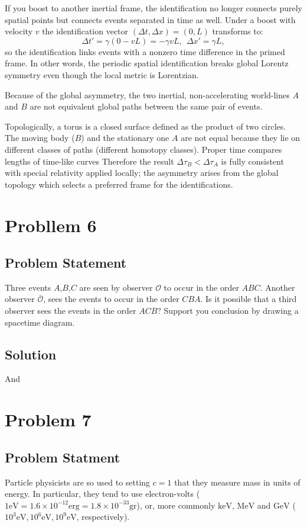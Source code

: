 \documentclass[10pt,twocoloumn]{article}
\newcommand{\addsvg}[4][1.0]{
    \begin{figure}[H]
        \centering
        
        \caption{#4}
        \label{fig:#3}
    \end{figure}
}
\begin{document}
If you boost to another inertial frame, the identification no longer connects purely spatial points but connects events separated in time as well. Under a boost with velocity $v$ the identification vector $(\Delta t, \Delta x) = (0,L)$ transforms to:
\begin{equation}
\Delta t' = \gamma(0-vL) = -\gamma vL , \ \ \Delta x' = \gamma L,
\end{equation}
so the identification links events with a nonzero time difference in the primed frame. In other words, the periodic spatial identification breaks global Lorentz symmetry even though the local metric is Lorentzian.

Because of the global asymmetry, the two inertial, non-accelerating world-lines $A$ and $B$ are not equivalent global paths between the same pair of events.
\addsvg[0.5]{./different-homotopy-classes-on-the-torus.svg}{homtop}{}
Topologically, a torus is a closed surface defined as the product of two circles. The moving body ($B$) and the stationary one $A$ are not equal because they lie on different classes of paths (different homotopy classes). Proper time compares lengths of time-like curves
Therefore the result $\Delta\tau_B < \Delta\tau_A$ is fully consistent with special relativity applied locally; the asymmetry arises from the global topology which selects a preferred frame for the identifications.

\section*{Probllem 6}
\subsection*{Problem Statement}
Three events $A$,$B$,$C$ are seen by observer $\mathcal{O}$ to occur in the order $ABC$. Another observer $\bar{\mathcal{O}}$, sees the events to occur in the order $CBA$. Is it possible that a third observer sees the events in the order $ACB$? Support you conclusion by drawing a spacetime diagram.
\subsection*{Solution}
And
\section*{Problem 7}
\subsection*{Problem Statment}
Particle physicists are so used to setting $c=1$ that they measure mass in units of energy. In particular, they tend to use electron-volts ($1\text{eV} = 1.6 \times10^{-12}\text{erg} = 1.8\times10^{-33}\text{gr}$), or, more commonly $\text{keV}$, $\text{MeV}$ and $\text{GeV}$ ($10^3 \text{eV}, 10^6\text{eV}, 10^9\text{eV}$, respectively).
\end{document}
